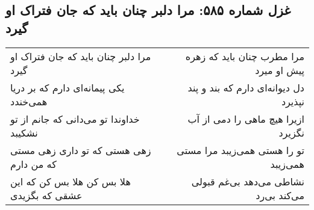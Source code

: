 \begin{center}
\section*{غزل شماره ۵۸۵: مرا دلبر چنان باید که جان فتراک او گیرد}
\label{sec:0585}
\begin{longtable}{l p{0.5cm} r}
مرا دلبر چنان باید که جان فتراک او گیرد
&&
مرا مطرب چنان باید که زهره پیش او میرد
\\
یکی پیمانه‌ای دارم که بر دریا همی‌خندد
&&
دل دیوانه‌ای دارم که بند و پند نپذیرد
\\
خداوندا تو می‌دانی که جانم از تو نشکیبد
&&
ازیرا هیچ ماهی را دمی از آب نگزیرد
\\
زهی هستی که تو داری زهی مستی که من دارم
&&
تو را هستی همی‌زیبد مرا مستی همی‌زیبد
\\
هلا بس کن هلا بس کن که این عشقی که بگزیدی
&&
نشاطی می‌دهد بی‌غم قبولی می‌کند بی‌رد
\\
\end{longtable}
\end{center}
